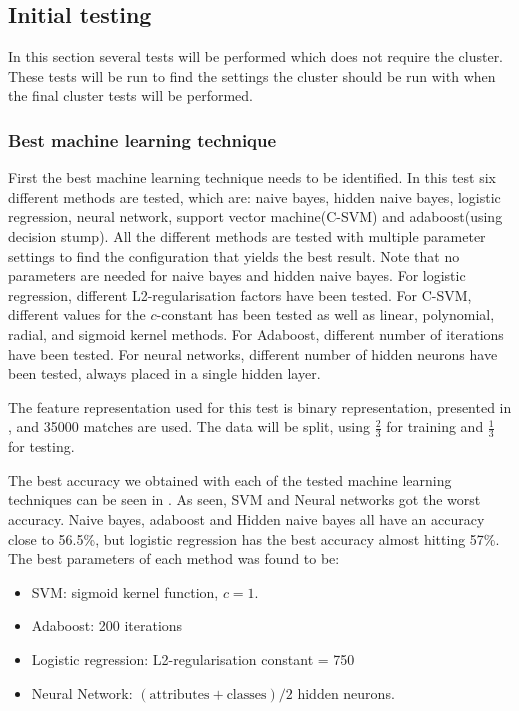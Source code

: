 \subsection{Initial testing}\label{sec:initialtest}
In this section several tests will be performed which does not require the cluster. These tests will be run to find the settings the cluster should be run with when the final cluster tests will be performed.

\subsubsection{Best machine learning technique}
First the best machine learning technique needs to be identified. In this test six different methods are tested, which are: naive bayes, hidden naive bayes, logistic regression, neural network, support vector machine(C-SVM) and adaboost(using decision stump). All the different methods are tested with multiple parameter settings to find the configuration that yields the best result. Note that no parameters are needed for naive bayes and hidden naive bayes. For logistic regression, different L2-regularisation factors have been tested. For C-SVM, different values for the $c$-constant has been tested as well as linear, polynomial, radial, and sigmoid kernel methods. For Adaboost, different number of iterations have been tested. For neural networks, different number of hidden neurons have been tested, always placed in a single hidden layer.

The feature representation used for this test is binary representation, presented in , and 35000 matches are used. The data will be split, using $\frac{2}{3}$ for training and $\frac{1}{3}$ for testing. 

The best accuracy we obtained with each of the tested machine learning techniques can be seen in . As seen, SVM and Neural networks got the worst accuracy. Naive bayes, adaboost and Hidden naive bayes all have an accuracy close to 56.5\%, but logistic regression has the best accuracy almost hitting 57\%.
The best parameters of each method was found to be:
\begin{itemize}
\item SVM: sigmoid kernel function, $c = 1$.
\item Adaboost: 200 iterations
\item Logistic regression: L2-regularisation constant = 750
\item Neural Network: $(\text{attributes} + \text{classes}) / 2$ hidden neurons.
\end{itemize}

